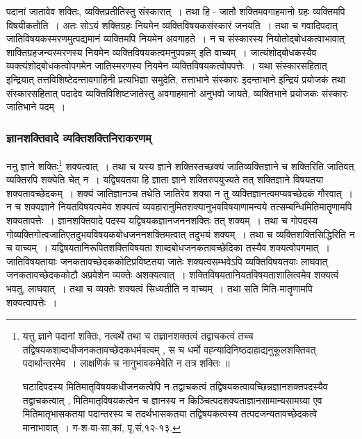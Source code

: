 				पदानां जातावेव शक्तिः, व्यक्तिप्रतीतिस्तु संस्कारात्~। तथा हि - जातौ शक्तिमवगाहमानो ग्रहः व्यक्तिमपि विषयीकतोति~। अतः सोऽयं शक्तिग्रहः नियमेन व्यक्तिविषयकसंस्कारं जनयति~। तथा च गवादिपदात् जातिविषयकस्मरणमुत्पद्यमानं व्यक्तिमपि नियमेन अवगाहते~। न च संस्कारस्य नियोतोद्बोधकत्वाभावात् शाक्तिग्रहजन्यस्मरणस्य नियमेन व्यक्तिविषयकत्वमनुपपन्नम् इति वाच्यम्~। जात्यंशोद्बोधकस्यैव व्यक्त्यंशोद्बोधकत्वोपगमेन जातिस्मरणस्य नियमेन व्यक्तिविषयकत्वोपपत्तेः~। यथा संस्कारसहितात् इन्द्रियात् तत्तविशिष्टेदन्तावगाहिनी प्रत्यभिज्ञा समुदेति, तत्ताभाने संस्कारः इदन्ताभाने इन्द्रियं प्रयोजकं तथा संस्कारसहितात् पदादेव व्यक्तिविशिष्टजातेस्तु अवगाहमानो अनुभवो जायते, व्यक्तिभाने प्रयोजकः संस्कारः जातिभाने पदम्~।

			\subsubsection{ज्ञानशक्तिवादे व्यक्तिशक्तिनिराकरणम्}

				\begin{small}
					ननु ज्ञाने शक्तिः\footnote{यत्तु ज्ञाने पदानां शक्तिः, नत्वर्थे तथा च तज्ञानशक्तत्वं तद्वाचकत्वं  तच्च तद्विषयकशाब्दधीजनकतावच्छेदकधर्मवत्वम् , स च धर्मो वह्न्यादिनिष्ठदाहाद्यनुकूलशक्तिवत्  पदार्थान्तरमेव~। लाक्षणिकं च नानुभावकमेवेति न तत्र शक्तिः ॥
					
					घटादिपदस्य मितिमातृविषयकधीजनकत्वेपि न तद्वाचकत्वं तद्विषयकत्वावच्छिन्नज्ञानशक्तपदस्यैव  तद्वाचकत्वात् , मितिमातृविषयकत्वेन च ज्ञानस्य न  किञ्चित्पदशक्यताज्ञानसामान्यसामग्र्या एव मितिमातृभासकतया  पदान्तरस्य च तदर्थभासकतया  तद्विषयकत्वस्य  तत्पदजन्यतावच्छेदकत्वे  मानाभावात्~। ग-श-वा-सा,कां, पृ,सं,१२-१३.} शक्यत्वात्~। तथा च यस्य ज्ञाने शक्तिस्तच्छक्यं जातिव्यक्तिज्ञाने च शक्तिरिति जातिवत् व्यक्तिरपि शक्येति चेत् न~। यद्विषयतया हि ज्ञाता ज्ञाने शक्तिरुपयुज्यते तत् शक्तिज्ञाने विषयतया शक्यतावच्छेदकम्~। शक्यं जातिज्ञानञ्च तथेति जातिरेव शक्या न तु व्यक्तिज्ञानत्वमप्यवच्छेदकं गौरवात्~। न च शक्यज्ञाने नियतविषयत्वमेव शक्यत्वं व्यवहारानुमितशक्यानुभवविषयाणामन्वये तत्सम्बन्धिमितिमातॄणामपि शक्यतापत्तेः~। 	ज्ञानशक्तिवादे पदस्य यद्विषयकज्ञानजननशक्तिः तत् शक्यम्~। तथा च गोपदस्य गोव्यक्तिगोत्वजातिएतदुभयविषयकबोधजननशक्तिमत्वात् तदुभयं शक्यम्~। तथा च व्यक्तिशक्तिसिद्धिरिति न च वाच्यम्~। यद्विषयतानिरूपितशक्तिविषयता शाब्दबोधजनकतावच्छेदिका तस्यैव शक्यत्वोपगमात्~। जातिविषयतायाः जनकतावच्छेदककोटिप्रविष्टतया जातेः शक्यत्वसम्भवेऽपि व्यक्तिविषयतयाः लाघवात् जनकतावच्छेदककोटौ अप्रवेशेन व्यक्तेः अशक्यत्वात्~। शक्तिविषयतानियतविषयताशालित्वमेव शक्यत्वं भवतु, लाघवात्~। तथा च व्यक्तेः  शक्यत्वं सिध्यतीति न वाच्यम्~। तथा सति मिति-मातॄणामपि शक्यत्वापत्तेः~।
				\end{small}	

